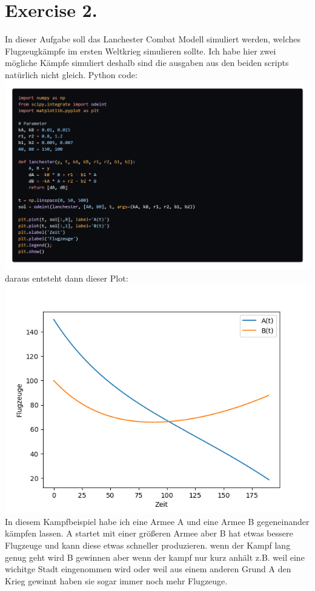 \documentclass{scrartcl}
\begin{document}
\section*{Exercise 2.}
In dieser Aufgabe soll das Lanchester Combat Modell simuliert werden, welches Flugzeugkämpfe im ersten Weltkrieg simulieren sollte. Ich habe hier zwei mögliche Kämpfe simuliert deshalb sind die ausgaben aus den beiden scripts natürlich nicht gleich. Python code:\\
\includegraphics*[scale=0.24]{Lanchester_py_code.png}\\
daraus entsteht dann dieser Plot:\\
\includegraphics*[scale=0.7]{Lanchester_Combat_py.png}\\
In diesem Kampfbeispiel habe ich eine Armee A und eine Armee B gegeneinander kämpfen lassen. A startet mit einer größeren Armee aber B hat etwas bessere Flugzeuge und kann diese etwas schneller produzieren. wenn der Kampf lang genug geht wird B gewinnen aber wenn der kampf nur kurz anhält z.B. weil eine wichitge Stadt eingenommen wird oder weil aus einem anderen Grund A den Krieg gewinnt haben sie sogar immer noch mehr Flugzeuge.\\
\end{document}
